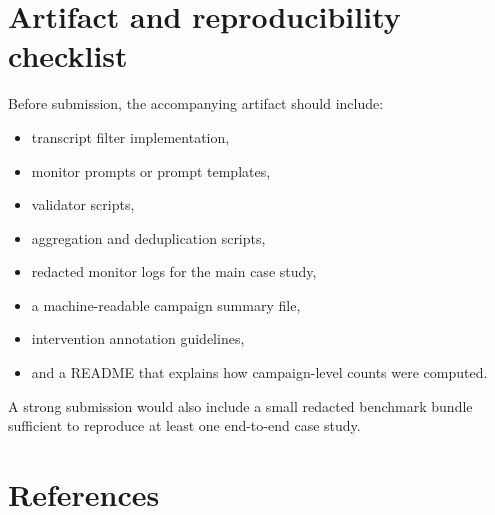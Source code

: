 \documentclass[11pt]{article}
\begin{document}
\section{Artifact and reproducibility checklist}

Before submission, the accompanying artifact should include:

\begin{itemize}[leftmargin=*,itemsep=2pt]
  \item transcript filter implementation,
  \item monitor prompts or prompt templates,
  \item validator scripts,
  \item aggregation and deduplication scripts,
  \item redacted monitor logs for the main case study,
  \item a machine-readable campaign summary file,
  \item intervention annotation guidelines,
  \item and a README that explains how campaign-level counts were computed.
\end{itemize}

A strong submission would also include a small redacted benchmark bundle sufficient to reproduce at least one end-to-end case study.

\section*{References}
\end{document}
